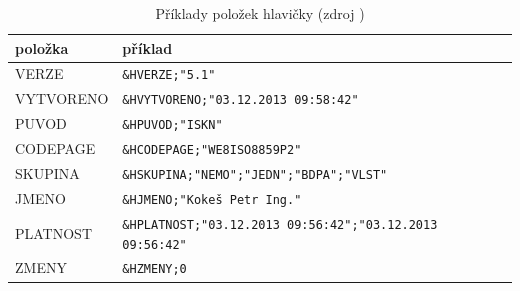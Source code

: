 \begin{table}[H]
    \begin{tabular}{|l|l|}
        \hline
         položka & příklad \\
        \hline
        \hline
         VERZE & \texttt{\&HVERZE;"5.1"} \\ \hline
         VYTVORENO & \texttt{\&HVYTVORENO;"03.12.2013 09:58:42"} \\ \hline
         PUVOD & \texttt{\&HPUVOD;"ISKN"} \\ \hline
         CODEPAGE & \texttt{\&HCODEPAGE;"WE8ISO8859P2"} \\ \hline
         SKUPINA & \texttt{\&HSKUPINA;"NEMO";"JEDN";"BDPA";"VLST"} \\ \hline
         JMENO & \texttt{\&HJMENO;"Kokeš Petr Ing."} \\ \hline
         PLATNOST & \texttt{\&HPLATNOST;"03.12.2013 09:56:42";"03.12.2013 09:56:42"} \\ \hline
         ZMENY & \texttt{\&HZMENY;0} \\
         \hline
    \end{tabular}
    \centering
    \caption[Příklady položek hlavičky]{Příklady položek hlavičky (zdroj \citep{struktura_vfk})}
    \label{tab:hlavicka_priklady}
\end{table}

